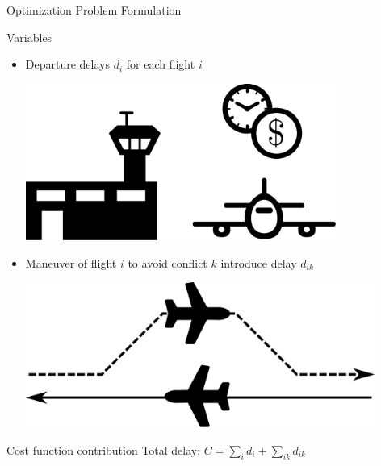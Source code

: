\documentclass[10pt]{beamer}
\begin{document}
\begin{frame}[t]{Optimization Problem Formulation}
    \begin{block}{Variables}
        \begin{itemize}
            \item Departure delays $d_i$ for each flight $i$
                \hspace{1cm}
                \begin{minipage}{0.3\linewidth}
                    \includegraphics[width=0.8\textwidth]{images/departure_delay.pdf} \\
                \end{minipage}
            \item 
                \begin{minipage}[t]{0.5\linewidth}
                    Maneuver of flight $i$ to avoid conflict $k$ introduce delay $d_{ik}$
                \end{minipage}
                \hspace{1cm}
                \begin{minipage}[c]{0.3\linewidth}
                    \includegraphics[width=0.9\textwidth]{images/conflict_avoiding_maneuver.pdf}
                \end{minipage}
       \end{itemize} 
    \end{block}
    \begin{block}{Cost function contribution}
        \centering
        Total delay: 
        $
            C = \sum_i d_i + \sum_{ik} d_{ik}
        $
    \end{block}
\end{frame}
 
\end{document}
